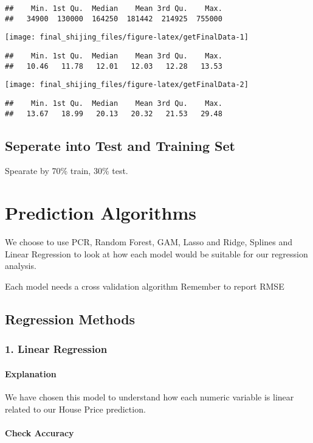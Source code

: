 \documentclass[
]{article}
\begin{document}
\begin{verbatim}
##    Min. 1st Qu.  Median    Mean 3rd Qu.    Max. 
##   34900  130000  164250  181442  214925  755000
\end{verbatim}

\texttt{[image: final\_shijing\_files/figure-latex/getFinalData-1]}

\begin{verbatim}
##    Min. 1st Qu.  Median    Mean 3rd Qu.    Max. 
##   10.46   11.78   12.01   12.03   12.28   13.53
\end{verbatim}

\texttt{[image: final\_shijing\_files/figure-latex/getFinalData-2]}

\begin{verbatim}
##    Min. 1st Qu.  Median    Mean 3rd Qu.    Max. 
##   13.67   18.99   20.13   20.32   21.53   29.48
\end{verbatim}

\hypertarget{seperate-into-test-and-training-set}{%
\subsection{Seperate into Test and Training
Set}\label{seperate-into-test-and-training-set}}

Spearate by 70\% train, 30\% test.

\hypertarget{prediction-algorithms}{%
\section{Prediction Algorithms}\label{prediction-algorithms}}

We choose to use PCR, Random Forest, GAM, Lasso and Ridge, Splines and
Linear Regression to look at how each model would be suitable for our
regression analysis.

Each model needs a cross validation algorithm Remember to report RMSE

\hypertarget{regression-methods}{%
\subsection{Regression Methods}\label{regression-methods}}

\hypertarget{linear-regression}{%
\subsubsection{1. Linear Regression}\label{linear-regression}}

\hypertarget{explanation}{%
\paragraph{Explanation}\label{explanation}}

We have chosen this model to understand how each numeric variable is
linear related to our House Price prediction.

\hypertarget{check-accuracy}{%
\paragraph{Check Accuracy}\label{check-accuracy}}
\end{document}
